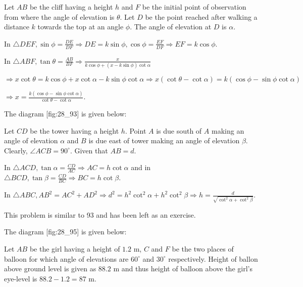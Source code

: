   \startplacefigure[reference=fig:28_92]
    \externalfigure[28_92.pdf]
  \stopplacefigure

  Let $AB$ be the cliff having a height $h$ and $F$ be the initial point of observation from where the angle of
  elevation is $\theta$. Let $D$ be the point reached after walking a distance $k$ towards the top at an angle
  $\phi$. The angle of elevation at $D$ is $\alpha$.

  In $\triangle DEF, \sin\phi = \frac{DE}{DF} \Rightarrow DE = k\sin\phi, \cos\phi = \frac{EF}{DF} \Rightarrow EF =
  k\cos\phi$.

  In $\triangle ABF, \tan\theta = \frac{AB}{BF} \Rightarrow \frac{x}{k\cos\phi + (x - k\sin\phi)\cot\alpha}$

  $\Rightarrow x\cot\theta = k\cos\phi + x\cot\alpha - k\sin\phi\cot\alpha \Rightarrow x(\cot\theta - \cot\alpha) =
  k(\cos\phi - \sin\phi\cot\alpha)$

  $\Rightarrow x = \frac{k(\cos\phi - \sin\phi\cot\alpha)}{\cot\theta - \cot\alpha}$.

\item The diagram [fig:28_93] is given below:

  \startplacefigure[reference=fig:28_93]
    \externalfigure[28_93.pdf]
  \stopplacefigure

  Let $CD$ be the tower having a height $h$. Point $A$ is due south of $A$ making an angle of elevation
  $\alpha$ and $B$ is due east of tower making an angle of elevation $\beta$. Clearly, $\angle ACB =
  90^\circ$. Given that $AB = d$.

  In $\triangle ACD, \tan\alpha = \frac{CD}{AC} \Rightarrow AC  = h\cot\alpha$ and in $\triangle BCD, \tan\beta =
  \frac{CD}{BC} \Rightarrow BC = h\cot\beta$.

  In $\triangle ABC, AB^2 = AC^2 + AD^2 \Rightarrow d^2 = h^2\cot^2\alpha + h^2\cot^2\beta \Rightarrow h =
  \frac{d}{\sqrt{\cot^2\alpha + \cot^2\beta}}$.

\item This problem is similar to 93 and has been left as an exercise.

\item The diagram [fig:28_95] is given below:

  \startplacefigure[reference=fig:28_95]
    \externalfigure[28_95.pdf]
  \stopplacefigure

  Let $AB$ be the girl having a height of $1.2$ m, $C$ and $F$ be the two places of balloon for which
  angle of elevations are $60^\circ$ and $30^\circ$ respectively. Height of ballon above ground level is given as
  $88.2$ m and thus height of balloon above the girl's eye-level is $88.2 - 1.2 = 87$ m.

